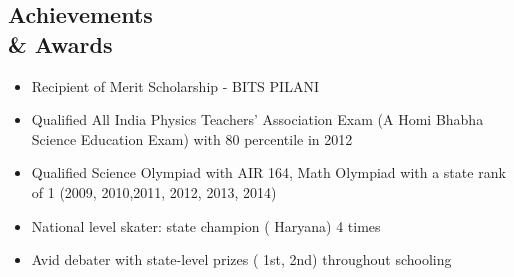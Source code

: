 \documentclass[margin,line]{templates/resume}
\newcommand{\compresslist}{%
\setlength{\itemsep}{3pt}%
\setlength{\parskip}{0pt}%
\setlength{\parsep}{0pt}%
}
\begin{document}
\begin{resume}
\section{\mysidestyle Achievements\\\& Awards} 
\vspace{0.01cm}
\begin{itemize}[leftmargin=*]\compresslist
\item Recipient of Merit Scholarship - BITS PILANI 
\item Qualified All India Physics Teachers' Association Exam (A Homi Bhabha Science Education Exam) with 80 percentile in 2012
\item Qualified Science Olympiad with AIR 164, Math Olympiad with a state rank of 1 (2009, 2010,2011, 2012, 2013, 2014)
\item National level skater: state champion ( Haryana) 4 times
\item Avid debater with state-level prizes ( 1st, 2nd) throughout schooling
\end{itemize}

\end{resume}
\end{document}
